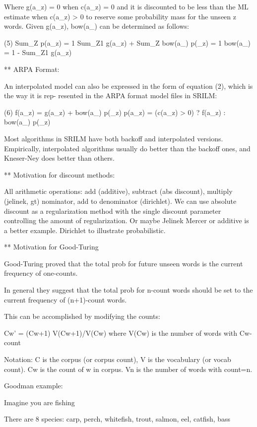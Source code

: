        Where g(a_z) = 0 when c(a_z) = 0 and it is discounted to be less than the ML estimate when c(a_z) > 0
       to  reserve some probability mass for the unseen z words.  Given g(a_z), bow(a_) can be determined as
       follows:

       (5)  Sum_Z  p(a_z) = 1
            Sum_Z1 g(a_z) + Sum_Z bow(a_) p(_z) = 1
            bow(a_) = 1 - Sum_Z1 g(a_z)

** ARPA Format:

       An interpolated model can also be expressed in the form of equation (2), which is the way it is  rep-
       resented in the ARPA format model files in SRILM:

       (6)  f(a_z) = g(a_z) + bow(a_) p(_z)
            p(a_z) = (c(a_z) > 0) ? f(a_z) : bow(a_) p(_z)

       Most  algorithms  in  SRILM  have  both backoff and interpolated versions.  Empirically, interpolated
       algorithms usually do better than the backoff ones, and Kneser-Ney does better than others.



** Motivation for discount methods:

All arithmetic operations: add (additive), subtract (abs discount),
multiply (jelinek, gt) nominator, add to denominator (dirichlet).  We
can use absolute discount as a regularization method with the single
discount parameter controlling the amount of regularization.  Or maybe
Jelinek Mercer or additive is a better example.  Dirichlet to
illustrate probabilistic.

** Motivation for Good-Turing

Good-Turing proved that the total prob for future unseen words is the
current frequency of one-counts.

In general they suggest that the total prob for n-count words should
be set to the current frequency of (n+1)-count words.

This can be accomplished by modifying the counts:

Cw' = (Cw+1) V(Cw+1)/V(Cw)  where V(Cw) is the number of words with Cw-count

Notation: C is the corpus (or corpus count), V is the vocabulary (or
vocab count).  Cw is the count of w in corpus.  Vn is the number of
words with count=n.

Goodman example:

Imagine you are fishing

There are 8 species: carp, perch, whitefish, trout, salmon, eel,
catfish, bass

